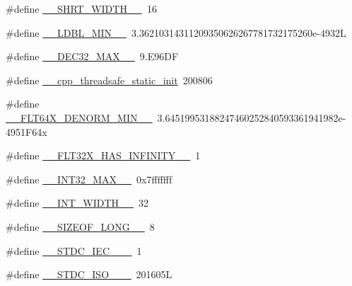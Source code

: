 \begin{DoxyCompactItemize}
\item 
\#define \hyperlink{cmake-build-debug_2babel__client__autogen_2moc__predefs_8h_aeb2d8312284d49b1e44c7d003bd8b54b}{\+\_\+\+\_\+\+S\+H\+R\+T\+\_\+\+W\+I\+D\+T\+H\+\_\+\+\_\+}~16
\item 
\#define \hyperlink{cmake-build-debug_2babel__client__autogen_2moc__predefs_8h_ab572f59c4b0c5a1f4c2953f38a76d7b3}{\+\_\+\+\_\+\+L\+D\+B\+L\+\_\+\+M\+I\+N\+\_\+\+\_\+}~3.\+36210314311209350626267781732175260e-\/4932L
\item 
\#define \hyperlink{cmake-build-debug_2babel__client__autogen_2moc__predefs_8h_ad3165a97a460b88ccdea80967918f250}{\+\_\+\+\_\+\+D\+E\+C32\+\_\+\+M\+A\+X\+\_\+\+\_\+}~9.\+E96\+DF
\item 
\#define \hyperlink{cmake-build-debug_2babel__client__autogen_2moc__predefs_8h_aaa322b38474911c60e45134194bd6e8f}{\+\_\+\+\_\+cpp\+\_\+threadsafe\+\_\+static\+\_\+init}~200806
\item 
\#define \hyperlink{cmake-build-debug_2babel__client__autogen_2moc__predefs_8h_ac0fe3e739d0b847c07dde20eabf2ab3d}{\+\_\+\+\_\+\+F\+L\+T64\+X\+\_\+\+D\+E\+N\+O\+R\+M\+\_\+\+M\+I\+N\+\_\+\+\_\+}~3.\+64519953188247460252840593361941982e-\/4951\+F64x
\item 
\#define \hyperlink{cmake-build-debug_2babel__client__autogen_2moc__predefs_8h_a8f246ad899706f78b8dfcd33daff7b07}{\+\_\+\+\_\+\+F\+L\+T32\+X\+\_\+\+H\+A\+S\+\_\+\+I\+N\+F\+I\+N\+I\+T\+Y\+\_\+\+\_\+}~1
\item 
\#define \hyperlink{cmake-build-debug_2babel__client__autogen_2moc__predefs_8h_abf681096fa9e21512a3fe83f0dcfdb36}{\+\_\+\+\_\+\+I\+N\+T32\+\_\+\+M\+A\+X\+\_\+\+\_\+}~0x7fffffff
\item 
\#define \hyperlink{cmake-build-debug_2babel__client__autogen_2moc__predefs_8h_ad3907b8d9bb2265255e6e0d66d91d165}{\+\_\+\+\_\+\+I\+N\+T\+\_\+\+W\+I\+D\+T\+H\+\_\+\+\_\+}~32
\item 
\#define \hyperlink{cmake-build-debug_2babel__client__autogen_2moc__predefs_8h_aaa8084a56e3732008acafea8fd15eb2f}{\+\_\+\+\_\+\+S\+I\+Z\+E\+O\+F\+\_\+\+L\+O\+N\+G\+\_\+\+\_\+}~8
\item 
\#define \hyperlink{cmake-build-debug_2babel__client__autogen_2moc__predefs_8h_ab7d84ba8d87b8bb40aa752334bb51b23}{\+\_\+\+\_\+\+S\+T\+D\+C\+\_\+\+I\+E\+C\+\_\+\_\+\+\_\+}~1
\item 
\#define \hyperlink{cmake-build-debug_2babel__client__autogen_2moc__predefs_8h_acb6063ed9d8841cf71c93f2bf34832e0}{\+\_\+\+\_\+\+S\+T\+D\+C\+\_\+\+I\+S\+O\+\_\+\_\+\+\_\+}~201605L

\end{DoxyCompactItemize}
